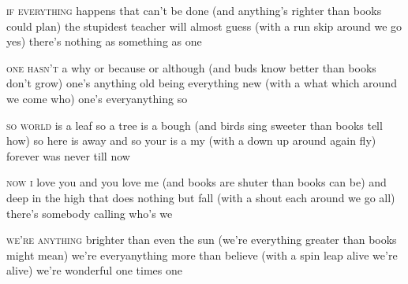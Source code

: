 \documentclass[fontsize=9, a5paper]{scrbook}
\begin{document}
\pagebreak

\begin{poem}
	\begin{stanza}
		\textsc{if everything} happens that can't be done\verseline
		(and anything's righter\verseline
		than books\verseline
		could plan)\verseline
		the stupidest teacher will almost guess\verseline
		(with a run\verseline
		skip\verseline
		around we go yes)\verseline
		there's nothing as something as one
	\end{stanza}

	\begin{stanza}
		\textsc{one hasn't} a why or because or although\verseline
		(and buds know better\verseline
		than books\verseline
		don't grow)\verseline
		one's anything old being everything new\verseline
		(with a what\verseline
		which\verseline
		around we come who)\verseline
		one's everyanything so
	\end{stanza}

	\begin{stanza}
		\textsc{so world} is a leaf so a tree is a bough\verseline
		(and birds sing sweeter\verseline
		than books\verseline
		tell how)\verseline
		so here is away and so your is a my\verseline
		(with a down\verseline
		up\verseline
		around again fly)\verseline
		forever was never till now
	\end{stanza}

	\pagebreak

	\begin{stanza}
		\textsc{now i} love you and you love me\verseline
		(and books are shuter\verseline
		than books\verseline
		can be)\verseline
		and deep in the high that does nothing but fall\verseline
		(with a shout\verseline
		each\verseline
		around we go all)\verseline
		there's somebody calling who's we
	\end{stanza}

	\begin{stanza}
		\textsc{we're anything} brighter than even the sun\verseline
		(we're everything greater\verseline
		than books\verseline
		might mean)\verseline
		we're everyanything more than believe\verseline
		(with a spin\verseline
		leap\verseline
		alive we're alive)\verseline
		we're wonderful one times one
	\end{stanza}
\end{poem}

\pagebreak
\end{document}
